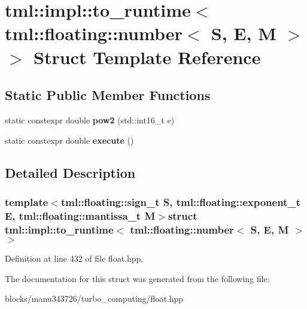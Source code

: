 \hypertarget{structtml_1_1impl_1_1to__runtime_3_01tml_1_1floating_1_1number_3_01_s_00_01_e_00_01_m_01_4_01_4}{\section{tml\+:\+:impl\+:\+:to\+\_\+runtime$<$ tml\+:\+:floating\+:\+:number$<$ S, E, M $>$ $>$ Struct Template Reference}
\label{structtml_1_1impl_1_1to__runtime_3_01tml_1_1floating_1_1number_3_01_s_00_01_e_00_01_m_01_4_01_4}
}
\subsection*{Static Public Member Functions}
\begin{DoxyCompactItemize}
\item 
\hypertarget{structtml_1_1impl_1_1to__runtime_3_01tml_1_1floating_1_1number_3_01_s_00_01_e_00_01_m_01_4_01_4_a1a8fc4d0bb58dbc1e2e96c48c27a6f62}{static constexpr double {\bfseries pow2} (std\+::int16\+\_\+t e)}\label{structtml_1_1impl_1_1to__runtime_3_01tml_1_1floating_1_1number_3_01_s_00_01_e_00_01_m_01_4_01_4_a1a8fc4d0bb58dbc1e2e96c48c27a6f62}

\item 
\hypertarget{structtml_1_1impl_1_1to__runtime_3_01tml_1_1floating_1_1number_3_01_s_00_01_e_00_01_m_01_4_01_4_acef5fde6f37c0a382797648a003a3d7d}{static constexpr double {\bfseries execute} ()}\label{structtml_1_1impl_1_1to__runtime_3_01tml_1_1floating_1_1number_3_01_s_00_01_e_00_01_m_01_4_01_4_acef5fde6f37c0a382797648a003a3d7d}

\end{DoxyCompactItemize}


\subsection{Detailed Description}
\subsubsection*{template$<$tml\+::floating\+::sign\+\_\+t S, tml\+::floating\+::exponent\+\_\+t E, tml\+::floating\+::mantissa\+\_\+t M$>$struct tml\+::impl\+::to\+\_\+runtime$<$ tml\+::floating\+::number$<$ S, E, M $>$ $>$}



Definition at line 432 of file float.\+hpp.



The documentation for this struct was generated from the following file\+:\begin{DoxyCompactItemize}
\item 
blocks/manu343726/turbo\+\_\+computing/float.\+hpp\end{DoxyCompactItemize}
